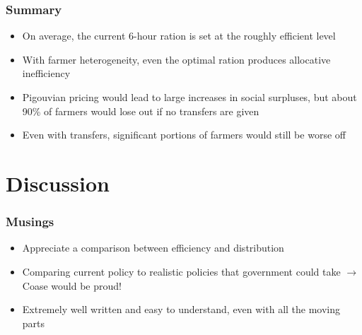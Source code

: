 \documentclass[aspectratio=169]{beamer}
\begin{document}
\begin{frame}
    \frametitle{Summary}
    \begin{itemize}
        \item On average, the current 6-hour ration is set at the roughly efficient level
        \item With farmer heterogeneity, even the optimal ration produces allocative inefficiency
        \item Pigouvian pricing would lead to large increases in social surpluses, but about 90\% of farmers would lose out if no transfers are given 
        \item Even with transfers, significant portions of farmers would still be worse off 
    \end{itemize}
\end{frame}

\section{Discussion} 
\begin{frame}
    \frametitle{Musings}
    \begin{itemize}
        \item Appreciate a comparison between efficiency and distribution
        \item Comparing current policy to realistic policies that government could take $\rightarrow$ Coase would be proud!
        \item Extremely well written and easy to understand, even with all the moving parts 
    \end{itemize}
\end{frame}
\end{document}
